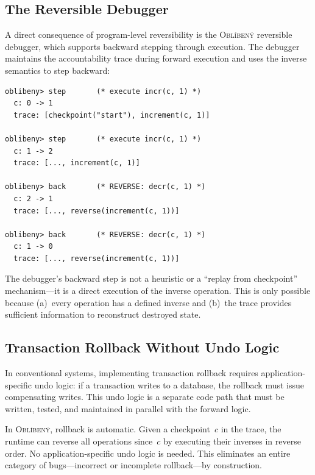 \documentclass[11pt,a4paper]{article}
\newcommand{\obl}{\textsc{Obl\'{i}ben\'{y}}}
\begin{document}
\subsection{The Reversible Debugger}

A direct consequence of program-level reversibility is the \obl{} reversible
debugger, which supports backward stepping through execution.  The debugger
maintains the accountability trace during forward execution and uses the
inverse semantics to step backward:

\begin{lstlisting}[language={},caption={Reversible debugger session}]
oblibeny> step       (* execute incr(c, 1) *)
  c: 0 -> 1
  trace: [checkpoint("start"), increment(c, 1)]

oblibeny> step       (* execute incr(c, 1) *)
  c: 1 -> 2
  trace: [..., increment(c, 1)]

oblibeny> back       (* REVERSE: decr(c, 1) *)
  c: 2 -> 1
  trace: [..., reverse(increment(c, 1))]

oblibeny> back       (* REVERSE: decr(c, 1) *)
  c: 1 -> 0
  trace: [..., reverse(increment(c, 1))]
\end{lstlisting}

The debugger's backward step is not a heuristic or a ``replay from
checkpoint'' mechanism---it is a direct execution of the inverse operation.
This is only possible because (a)~every operation has a defined inverse and
(b)~the trace provides sufficient information to reconstruct destroyed state.

\subsection{Transaction Rollback Without Undo Logic}

In conventional systems, implementing transaction rollback requires
application-specific undo logic: if a transaction writes to a database, the
rollback must issue compensating writes.  This undo logic is a separate code
path that must be written, tested, and maintained in parallel with the forward
logic.

In \obl{}, rollback is automatic.  Given a checkpoint~$c$ in the trace, the
runtime can reverse all operations since~$c$ by executing their inverses in
reverse order.  No application-specific undo logic is needed.  This
eliminates an entire category of bugs---incorrect or incomplete rollback---by
construction.


\end{document}
